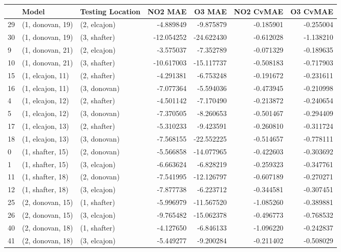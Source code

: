 \begin{tabular}{lllrrrr}
\toprule
{} &             Model & Testing Location &    NO2 MAE &     O3 MAE &  NO2 CvMAE &  O3 CvMAE \\
\midrule
29 &  (1, donovan, 19) &     (2, elcajon) &  -4.889849 &  -9.875879 &  -0.185901 & -0.255004 \\
30 &  (1, donovan, 19) &     (3, shafter) & -12.054252 & -24.622430 &  -0.612028 & -1.138210 \\
9  &  (1, donovan, 21) &     (2, elcajon) &  -3.575037 &  -7.352789 &  -0.071329 & -0.189635 \\
10 &  (1, donovan, 21) &     (3, shafter) & -10.617003 & -15.117737 &  -0.508183 & -0.717903 \\
15 &  (1, elcajon, 11) &     (2, shafter) &  -4.291381 &  -6.753248 &  -0.191672 & -0.231611 \\
16 &  (1, elcajon, 11) &     (3, donovan) &  -7.077364 &  -5.594036 &  -0.473945 & -0.210998 \\
4  &  (1, elcajon, 12) &     (2, shafter) &  -4.501142 &  -7.170490 &  -0.213872 & -0.240654 \\
5  &  (1, elcajon, 12) &     (3, donovan) &  -7.370505 &  -8.260653 &  -0.501467 & -0.294409 \\
17 &  (1, elcajon, 13) &     (2, shafter) &  -5.310233 &  -9.423591 &  -0.260810 & -0.311724 \\
18 &  (1, elcajon, 13) &     (3, donovan) &  -7.568155 & -22.552225 &  -0.514657 & -0.778111 \\
0  &  (1, shafter, 15) &     (2, donovan) &  -5.566858 & -14.077965 &  -0.422603 & -0.303692 \\
1  &  (1, shafter, 15) &     (3, elcajon) &  -6.663624 &  -6.828219 &  -0.259323 & -0.347761 \\
11 &  (1, shafter, 18) &     (2, donovan) &  -7.541995 & -12.126797 &  -0.607189 & -0.270271 \\
12 &  (1, shafter, 18) &     (3, elcajon) &  -7.877738 &  -6.223712 &  -0.344581 & -0.307451 \\
25 &  (2, donovan, 15) &     (1, shafter) &  -5.996979 & -11.567520 &  -1.085260 & -0.389881 \\
26 &  (2, donovan, 15) &     (3, elcajon) &  -9.765482 & -15.062378 &  -0.496773 & -0.768532 \\
40 &  (2, donovan, 18) &     (1, shafter) &  -4.127650 &  -6.846133 &  -1.096220 & -0.242837 \\
41 &  (2, donovan, 18) &     (3, elcajon) &  -5.449277 &  -9.200284 &  -0.211402 & -0.508029 \\

\end{tabular}
